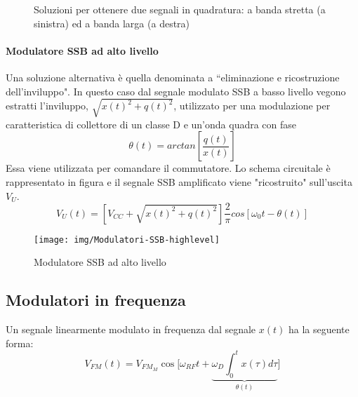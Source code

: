 \begin{figure}[hbt]
\centering
\hspace{\fill}
\hspace{\fill}
\hspace{\fill}
\caption{Soluzioni per ottenere due segnali in quadratura: a banda stretta (a sinistra) ed a banda larga (a destra)}
\label{fig:modulatori-ssb-lowlevel-sfasatore}
\end{figure}

\paragraph{Modulatore SSB ad alto livello}
Una soluzione alternativa è quella denominata a ``eliminazione e ricostruzione dell'inviluppo".
In questo caso dal segnale modulato SSB a basso livello vegono estratti l'inviluppo, $\sqrt{x(t)^2 + q(t)^2}$, utilizzato
per una modulazione per caratteristica di collettore di un classe D e un'onda quadra con fase
\[\theta(t) = arctan\left[\frac{q(t)}{x(t)}\right]  \]
Essa viene utilizzata per comandare il commutatore. Lo schema circuitale è rappresentato in figura e il segnale SSB amplificato viene "ricostruito" sull'uscita $V_U$.
\[V_U (t) = \left[ V_{CC} + \sqrt{x(t)^2 + q(t)^2} \right] \frac{2}{\pi} cos\left[\omega_0 t - \theta (t)\right] \]

\begin{figure}[tbh]
\centering
\texttt{[image: img/Modulatori-SSB-highlevel]}
\caption{Modulatore SSB ad alto livello}
\label{fig:modulatori-ssb-highlevel}
\end{figure}


\subsection{Modulatori in frequenza}
Un segnale linearmente modulato in frequenza dal segnale $x(t)$ ha la seguente forma:
\[
V_{FM}(t) = V_{FM_M} \cos \bigg[ \omega_{RF}t
+\underbrace{\omega_D \int_{0}^{t}x(\tau) d \tau}_\text{$\theta(t)$} \bigg]
\]

